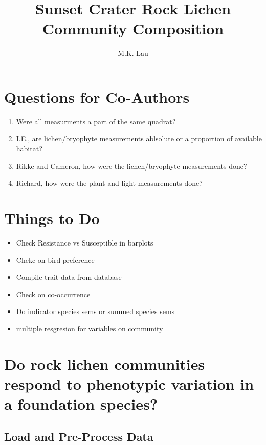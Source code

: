\documentclass[12pt]{article}
\title{Sunset Crater Rock Lichen Community Composition}
\author{M.K. Lau}
\begin{document}
\maketitle



\section{Questions for Co-Authors}
\begin{enumerate}
\item Were all measurments a part of the same quadrat? 
\item I.E., are lichen/bryophyte measurements ablsolute or a proportion of available
  habitat?
\item Rikke and Cameron, how were the lichen/bryophyte measurements
  done?
\item Richard, how were the plant and light measurements done?
\end{enumerate}

\section{Things to Do}

\begin{itemize}
\item Check Resistance vs Susceptible in barplots
\item Chekc on bird preference
\item Compile trait data from database
\item Check on co-occurrence
\item Do indicator species sems or summed species sems
\item multiple resgresion for variables on community
\end{itemize}


\section{Do rock lichen communities respond to phenotypic variation in
a foundation species?}

\subsection{Load and Pre-Process Data}
\end{document}
